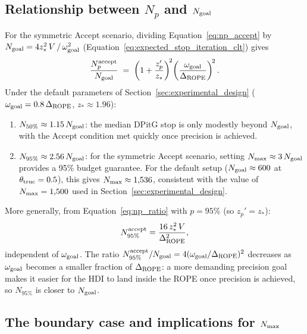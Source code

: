 \subsection*{Relationship between $N_p$ and $N_{\rm goal}$}

For the symmetric Accept scenario, dividing Equation~\ref{eq:np_accept} by
$N_{\rm goal} = 4z_*^2\,V\,/\,\omega_{\rm goal}^2$
(Equation~\ref{eq:expected_stop_iteration_clt}) gives
\begin{equation}\label{eq:np_ratio}
    \frac{N_p^{\rm accept}}{N_{\rm goal}}
    \;=\;
    \left(1 + \frac{z_p'}{z_*}\right)^{\!2}
    \!\left(\frac{\omega_{\rm goal}}{\Delta_{\rm ROPE}}\right)^{\!2}.
\end{equation}
Under the default parameters of Section~\ref{sec:experimental_design}
($\omega_{\rm goal} = 0.8\,\Delta_{\rm ROPE}$, $z_* \approx 1.96$):

\begin{enumerate}[label=(\alph*)]
    \item $N_{50\%} \approx 1.15\,N_{\rm goal}$: the median DPitG stop is only modestly beyond
    $N_{\rm goal}$, with the Accept condition met quickly once precision is achieved.
    \item $N_{95\%} \approx 2.56\,N_{\rm goal}$: for the symmetric Accept scenario,
    setting $N_{\rm max} \approx 3\,N_{\rm goal}$ provides a 95\% budget guarantee.
    For the default setup ($N_{\rm goal} \approx 600$ at $\theta_{\rm true} = 0.5$),
    this gives $N_{\rm max} \approx 1{,}536$, consistent with the value of $N_{\rm max} = 1{,}500$
    used in Section~\ref{sec:experimental_design}.
\end{enumerate}

More generally, from Equation~\ref{eq:np_ratio} with $p = 95\%$ (so $z_p' = z_*$):
\begin{equation}\label{eq:n95_general}
    N_{95\%}^{\rm accept} = \frac{16\,z_*^2\,V}{\Delta_{\rm ROPE}^2},
\end{equation}
independent of $\omega_{\rm goal}$.
The ratio $N_{95\%}^{\rm accept} / N_{\rm goal} = 4(\omega_{\rm goal}/\Delta_{\rm ROPE})^2$
decreases as $\omega_{\rm goal}$ becomes a smaller fraction of $\Delta_{\rm ROPE}$: a more
demanding precision goal makes it easier for the HDI to land inside the ROPE once precision
is achieved, so $N_{95\%}$ is closer to $N_{\rm goal}$.

\subsection*{The boundary case and implications for $N_{\rm max}$}


